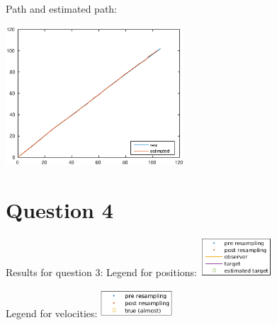 \documentclass[english,DIV=13]{scrartcl}
\begin{document}
Path and estimated path:
\begin{center}
   \includegraphics[width=0.5\textwidth]{img/q3_path.eps}
\end{center}

\section*{Question 4}


Results for question 3:
Legend for positions: \includegraphics[width=0.2\textwidth]{img/q4_legend1.png}

Legend for velocities: \includegraphics[width=0.2\textwidth]{img/q4_legend2.png}
\end{document}
